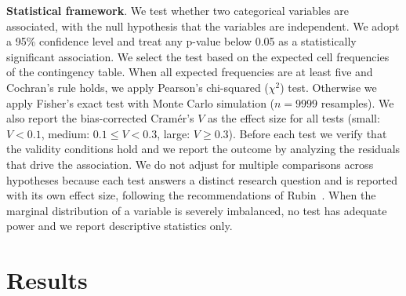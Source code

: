\documentclass[a4paper,USenglish,cleveref,autoref,thm-restate,anonymous]{lipics-v2021}       %
\begin{document}
\textbf{Statistical framework}.
We test whether two categorical variables are associated,
with the null hypothesis
that the variables are independent.
We adopt a 95\% confidence level
and treat any p-value below 0.05
as a statistically significant association.
We select the test
based on the expected cell frequencies of the contingency table.
When all expected frequencies are at least five
and Cochran's rule holds,
we apply Pearson's chi-squared ($\chi^2$) test.
Otherwise we apply Fisher's exact test
with Monte Carlo simulation ($n=9999$ resamples).
We also report the bias-corrected Cram\'er's $V$ as the effect size for all tests
(small: $V < 0.1$, medium: $0.1 \le V < 0.3$, large: $V \ge 0.3$).
Before each test we verify that the validity conditions hold
and we report the outcome by analyzing the residuals that drive the association.
We do not adjust for multiple comparisons across hypotheses
because each test answers a distinct research question
and is reported with its own effect size,
following the recommendations of Rubin~\cite{rubin2021}.
When the marginal distribution of a variable is severely imbalanced,
no test has adequate power and we report descriptive statistics only.

\section{Results}
\end{document}
